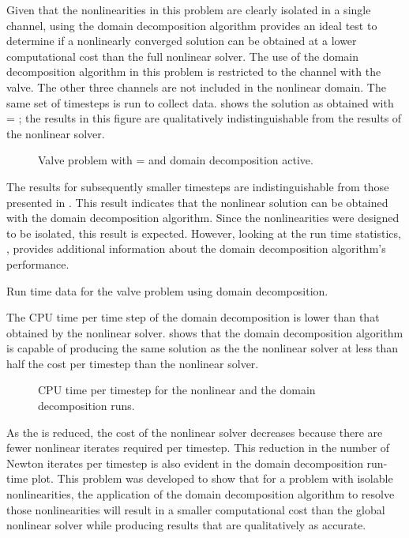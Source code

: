 Given that the nonlinearities in this problem are clearly isolated in a single channel, using the domain decomposition algorithm provides an ideal test to determine if a nonlinearly converged solution can be obtained at a lower computational cost than the full nonlinear solver.
The use of the domain decomposition algorithm in this problem is restricted to the channel with the valve.
The other three channels are not included in the nonlinear domain.
The same set of timesteps is run to collect data.
 shows the solution as obtained with \dtmax{} = ; the results in this figure are qualitatively indistinguishable from the results of the nonlinear solver.

\begin{figure}[h!tb]
\centering

\caption{Valve problem with \dtmax{} =  and domain decomposition active.}
\label{fig:valveDom6pt25em02}
\end{figure}

The results for subsequently smaller timesteps are indistinguishable from those presented in .
This result indicates that the nonlinear solution can be obtained with the domain decomposition algorithm.
Since the nonlinearities were designed to be isolated, this result is expected.
However, looking at the run time statistics, , provides additional information about the domain decomposition algorithm's performance.

\begin{table}[h!tb]
\centering
\singlespace

\caption{Run time data for the valve problem using domain decomposition.}
\label{tab:valveDomTable}
\end{table}

The CPU time per time step of the domain decomposition is lower than that obtained by the nonlinear solver.
 shows that the domain decomposition algorithm is capable of producing the same solution as the the nonlinear solver at less than half the cost per timestep than the nonlinear solver.

\begin{figure}[h!tb]
\centering

\caption{CPU time per timestep for the nonlinear and the domain decomposition runs.}
\label{fig:valveRunTime}
\end{figure}

As the \dtmax{} is reduced, the cost of the nonlinear solver decreases because there are fewer nonlinear iterates required per timestep.
This reduction in the number of Newton iterates per timestep is also evident in the domain decomposition run-time plot.
This problem was developed to show that for a problem with isolable nonlinearities, the application of the domain decomposition algorithm to resolve those nonlinearities will result in a smaller computational cost than the global nonlinear solver while producing results that are qualitatively as accurate.


